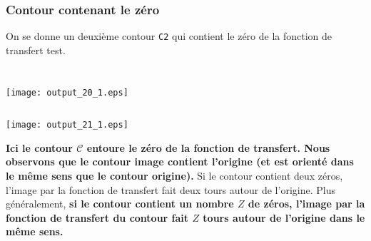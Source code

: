 \subsubsection{Contour contenant le zéro\label{contour-contenant-le-zuxe9ro}}
On se donne un deuxième contour \texttt{C2} qui contient le zéro de la
fonction de transfert test.
\begin{tcolorbox}[breakable, size=fbox, boxrule=1pt, 
    pad at break*=1mm,colback=cellbackground, colframe=cellborder]
\inputminted{python}{codes/python/annexe_cauchy_cellule9.py}
\end{tcolorbox}
\begin{tcolorbox}[breakable, size=fbox, boxrule=1pt, 
    pad at break*=1mm,colback=cellbackground, colframe=cellborder]
\inputminted{python}{codes/python/annexe_cauchy_cellule10.py}
\end{tcolorbox}
\begin{center}
    \texttt{[image: output\_20\_1.eps]}
\end{center}
\begin{tcolorbox}[breakable, size=fbox, boxrule=1pt, 
    pad at break*=1mm,colback=cellbackground, colframe=cellborder]
\inputminted{python}{codes/python/annexe_cauchy_cellule11.py}
\end{tcolorbox}
\begin{center}
    \texttt{[image: output\_21\_1.eps]}
\end{center}
\textbf{Ici le contour \(\mathcal{C}\) entoure le zéro de la fonction de
transfert. Nous observons que le contour image contient l'origine (et
est orienté dans le même sens que le contour origine).} 
Si le contour contient deux zéros, l'image par la fonction de transfert
fait deux tours autour de l'origine. Plus généralement, \textbf{si le
contour contient un nombre \(Z\) de zéros, l'image par la fonction de
transfert du contour fait \(Z\) tours autour de l'origine dans le même
sens.} 

